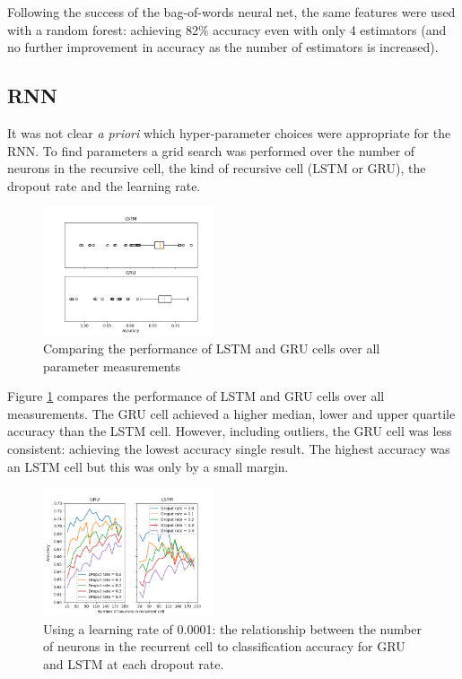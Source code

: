   Following the success of the bag-of-words neural net, the same features were
  used with a random forest: achieving 82\% accuracy even with only 4 estimators
  (and no further improvement in accuracy as the number of estimators is increased).

  \subsection{RNN}
  \label{sec:rnn_grid_search}

    It was not clear \textit{a priori} which hyper-parameter choices were
    appropriate for the RNN. To find parameters a grid search was performed over
    the number of neurons in the recursive cell, the kind of recursive cell
    (LSTM or GRU), the dropout rate and the learning rate.

    \begin{figure}[ht]
      \includegraphics[width=0.45\textwidth]{Figures/lstm_gru_plot.png}
      \caption{Comparing the performance of LSTM and GRU cells over all
        parameter measurements}
      \label{fig:lstm_gru}
    \end{figure}

    Figure \ref{fig:lstm_gru} compares the performance of LSTM and GRU cells
    over all measurements. The GRU cell achieved a higher
    median, lower and upper quartile accuracy than the LSTM cell. However, including
    outliers, the GRU cell was less consistent: achieving the lowest accuracy
    single result. The highest accuracy was an LSTM cell but this was only by a
    small margin.

    \begin{figure}[ht]
      \includegraphics[width=0.45\textwidth]{Figures/n_neurons_plot-0-0001.png}
      \caption{Using a learning rate of 0.0001: the relationship between the number of neurons in the recurrent
        cell to classification accuracy for GRU and LSTM at each dropout rate.}
      \label{fig:learn_rate_0.0001}
    \end{figure}


